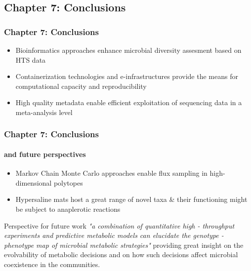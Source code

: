 \documentclass{beamer}
\begin{document}
   \begin{darkframes}
      \section{
         \textbf{\textbf{Chapter 7: } Conclusions}
      }

   \begin{frame}
      \frametitle{\textbf{Chapter 7: } Conclusions}

      \begin{itemize}

         \item Bioinformatics approaches enhance microbial diversity assesment based on HTS data
         \bigskip
         \item Containerization technologies and e-infrastructures provide the means for computational capacity and reproducibility
         \bigskip
         \item High quality metadata enable efficient exploitation of sequencing data in a meta-analysis level
         
      \end{itemize}
   \end{frame}

   \begin{frame}
      \frametitle{\textbf{Chapter 7: } Conclusions}
      \framesubtitle{and future perspectives}
      \begin{itemize}
         \item Markov Chain Monte Carlo approaches enable flux sampling in high-dimensional polytopes 
         \bigskip
         \item Hypersaline mats host a great range of novel taxa \& their functioning might be subject to anaplerotic reactions

      \end{itemize}
      \bigskip
      \begin{block}{Perspective for future work}
         \small
         \textit{
            "a combination of quantitative high - throughput experiments and predictive metabolic
            models can elucidate the genotype - phenotype map of microbial metabolic strategies"
         }
         providing great insight on the evolvability of metabolic decisions and on how such 
         decisions affect microbial coexistence in the communities. 
         
      \end{block}

   \end{frame}
   \end{darkframes}
\end{document}
